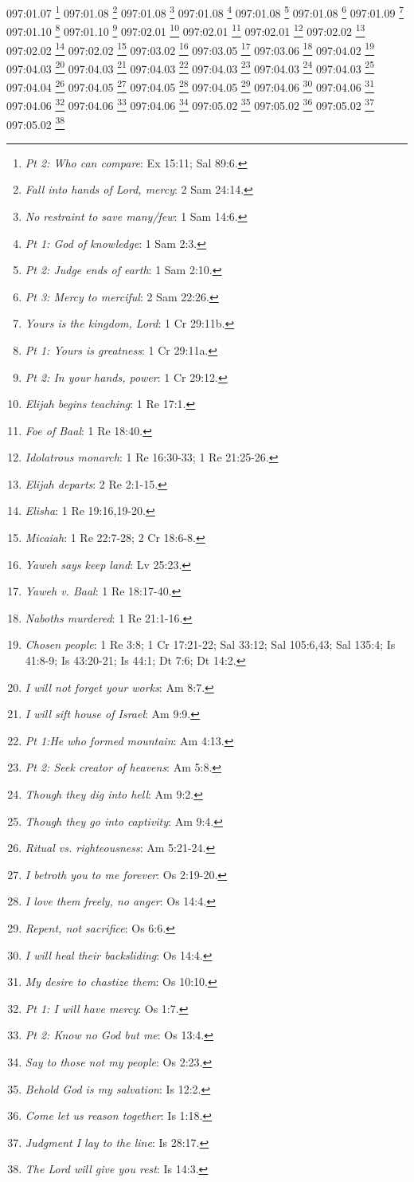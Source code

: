 {{{{{{{{{{{{{{{{{097:01.07 \footnote{\textit{Pt 2: Who can compare}: Ex 15:11; Sal 89:6.}
097:01.08 \footnote{\textit{Fall into hands of Lord, mercy}: 2 Sam 24:14.}
097:01.08 \footnote{\textit{No restraint to save many/few}: 1 Sam 14:6.}
097:01.08 \footnote{\textit{Pt 1: God of knowledge}: 1 Sam 2:3.}
097:01.08 \footnote{\textit{Pt 2: Judge ends of earth}: 1 Sam 2:10.}
097:01.08 \footnote{\textit{Pt 3: Mercy to merciful}: 2 Sam 22:26.}
097:01.09 \footnote{\textit{Yours is the kingdom, Lord}: 1 Cr 29:11b.}
097:01.10 \footnote{\textit{Pt 1: Yours is greatness}: 1 Cr 29:11a.}
097:01.10 \footnote{\textit{Pt 2: In your hands, power}: 1 Cr 29:12.}
097:02.01 \footnote{\textit{Elijah begins teaching}: 1 Re 17:1.}
097:02.01 \footnote{\textit{Foe of Baal}: 1 Re 18:40.}
097:02.01 \footnote{\textit{Idolatrous monarch}: 1 Re 16:30-33; 1 Re 21:25-26.}
097:02.02 \footnote{\textit{Elijah departs}: 2 Re 2:1-15.}
097:02.02 \footnote{\textit{Elisha}: 1 Re 19:16,19-20.}
097:02.02 \footnote{\textit{Micaiah}: 1 Re 22:7-28; 2 Cr 18:6-8.}
097:03.02 \footnote{\textit{Yaweh says keep land}: Lv 25:23.}
097:03.05 \footnote{\textit{Yaweh v. Baal}: 1 Re 18:17-40.}
097:03.06 \footnote{\textit{Naboths murdered}: 1 Re 21:1-16.}
097:04.02 \footnote{\textit{Chosen people}: 1 Re 3:8; 1 Cr 17:21-22; Sal 33:12; Sal 105:6,43; Sal 135:4; Is 41:8-9; Is 43:20-21; Is 44:1; Dt 7:6; Dt 14:2.}
097:04.03 \footnote{\textit{I will not forget your works}: Am 8:7.}
097:04.03 \footnote{\textit{I will sift house of Israel}: Am 9:9.}
097:04.03 \footnote{\textit{Pt 1:He who formed mountain}: Am 4:13.}
097:04.03 \footnote{\textit{Pt 2: Seek creator of heavens}: Am 5:8.}
097:04.03 \footnote{\textit{Though they dig into hell}: Am 9:2.}
097:04.03 \footnote{\textit{Though they go into captivity}: Am 9:4.}
097:04.04 \footnote{\textit{Ritual vs. righteousness}: Am 5:21-24.}
097:04.05 \footnote{\textit{I betroth you to me forever}: Os 2:19-20.}
097:04.05 \footnote{\textit{I love them freely, no anger}: Os 14:4.}
097:04.05 \footnote{\textit{Repent, not sacrifice}: Os 6:6.}
097:04.06 \footnote{\textit{I will heal their backsliding}: Os 14:4.}
097:04.06 \footnote{\textit{My desire to chastize them}: Os 10:10.}
097:04.06 \footnote{\textit{Pt 1: I will have mercy}: Os 1:7.}
097:04.06 \footnote{\textit{Pt 2: Know no God but me}: Os 13:4.}
097:04.06 \footnote{\textit{Say to those not my people}: Os 2:23.}
097:05.02 \footnote{\textit{Behold God is my salvation}: Is 12:2.}
097:05.02 \footnote{\textit{Come let us reason together}: Is 1:18.}
097:05.02 \footnote{\textit{Judgment I lay to the line}: Is 28:17.}
097:05.02 \footnote{\textit{The Lord will give you rest}: Is 14:3.}
}}}}}}}}}}}}}}}}}
